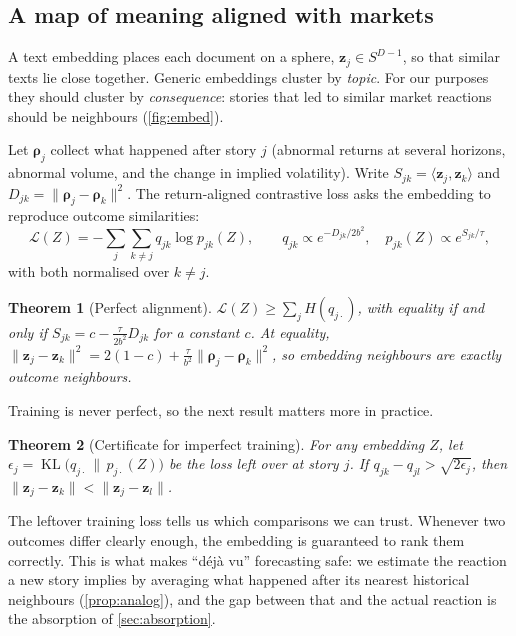 \documentclass[11pt,a4paper]{article}
\theoremstyle{sci}
\newtheorem{theorem}{Theorem}[section]
\theoremstyle{scidef}
\newcommand{\z}{\bm{z}}
\DeclareMathOperator{\KL}{KL}
\begin{document}
\subsection{A map of meaning aligned with markets}\label{sec:embeddings}

A text embedding places each document on a sphere, $\z_j\in S^{D-1}$, so that similar texts lie close together. Generic embeddings cluster by \emph{topic}. For our purposes they should cluster by \emph{consequence}: stories that led to similar market reactions should be neighbours (\cref{fig:embed}).

Let $\bm\rho_j$ collect what happened after story $j$ (abnormal returns at several horizons, abnormal volume, and the change in implied volatility). Write $S_{jk}=\langle\z_j,\z_k\rangle$ and $D_{jk}=\|\bm\rho_j-\bm\rho_k\|^2$. The return-aligned contrastive loss asks the embedding to reproduce outcome similarities:
\[
  \mathcal{L}(Z)=-\sum_j\sum_{k\neq j}q_{jk}\log p_{jk}(Z),\qquad q_{jk}\propto e^{-D_{jk}/2b^2},\quad p_{jk}(Z)\propto e^{S_{jk}/\tau},
\]
with both normalised over $k\neq j$.

\begin{theorem}[Perfect alignment]\label{thm:racl}
$\mathcal{L}(Z)\ge\sum_jH(q_{j\cdot})$, with equality if and only if $S_{jk}=c-\tfrac{\tau}{2b^2}D_{jk}$ for a constant $c$. At equality, $\|\z_j-\z_k\|^2=2(1-c)+\tfrac{\tau}{b^2}\|\bm\rho_j-\bm\rho_k\|^2$, so embedding neighbours are exactly outcome neighbours.
\end{theorem}

Training is never perfect, so the next result matters more in practice.

\begin{theorem}[Certificate for imperfect training]\label{thm:robustnn}
For any embedding $Z$, let $\epsilon_j=\KL\big(q_{j\cdot}\,\|\,p_{j\cdot}(Z)\big)$ be the loss left over at story $j$. If $q_{jk}-q_{jl}>\sqrt{2\epsilon_j}$, then $\|\z_j-\z_k\|<\|\z_j-\z_l\|$.
\end{theorem}

\begin{inwords}
The leftover training loss tells us which comparisons we can trust. Whenever two outcomes differ clearly enough, the embedding is guaranteed to rank them correctly. This is what makes ``d\'ej\`a vu'' forecasting safe: we estimate the reaction a new story implies by averaging what happened after its nearest historical neighbours (\cref{prop:analog}), and the gap between that and the actual reaction is the absorption of \cref{sec:absorption}.
\end{inwords}
\end{document}
